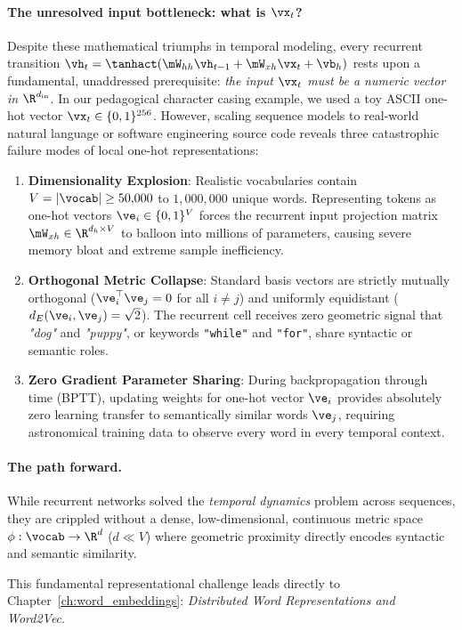 \documentclass[../../main.tex]{subfiles}
\begin{document}
\paragraph{The unresolved input bottleneck: what is $\vx_t$?}
Despite these mathematical triumphs in temporal modeling, every recurrent transition $\vh_t = \tanhact(\mW_{hh} \vh_{t-1} + \mW_{xh} \vx_t + \vb_h)$ rests upon a fundamental, unaddressed prerequisite: \emph{the input $\vx_t$ must be a numeric vector in $\R^{d_{\text{in}}}$}. In our pedagogical character casing example, we used a toy ASCII one-hot vector $\vx_t \in \{0, 1\}^{256}$. However, scaling sequence models to real-world natural language or software engineering source code reveals three catastrophic failure modes of local one-hot representations:
\begin{enumerate}
    \item \textbf{Dimensionality Explosion}: Realistic vocabularies contain $V = |\vocab| \ge 50{,}000$ to $1{,}000{,}000$ unique words. Representing tokens as one-hot vectors $\ve_i \in \{0, 1\}^V$ forces the recurrent input projection matrix $\mW_{xh} \in \R^{d_h \times V}$ to balloon into millions of parameters, causing severe memory bloat and extreme sample inefficiency.
    \item \textbf{Orthogonal Metric Collapse}: Standard basis vectors are strictly mutually orthogonal ($\ve_i^\top \ve_j = 0$ for all $i \ne j$) and uniformly equidistant ($d_E(\ve_i, \ve_j) = \sqrt{2}$). The recurrent cell receives zero geometric signal that \textit{"dog"} and \textit{"puppy"}, or keywords \texttt{"while"} and \texttt{"for"}, share syntactic or semantic roles.
    \item \textbf{Zero Gradient Parameter Sharing}: During backpropagation through time (BPTT), updating weights for one-hot vector $\ve_i$ provides absolutely zero learning transfer to semantically similar words $\ve_j$, requiring astronomical training data to observe every word in every temporal context.
\end{enumerate}

\paragraph{The path forward.}
While recurrent networks solved the \emph{temporal dynamics} problem across sequences, they are crippled without a dense, low-dimensional, continuous metric space $\phi: \vocab \to \R^d$ ($d \ll V$) where geometric proximity directly encodes syntactic and semantic similarity.

This fundamental representational challenge leads directly to Chapter~\ref{ch:word_embeddings}: \emph{Distributed Word Representations and Word2Vec}.
\end{document}
